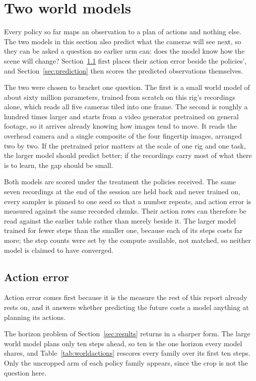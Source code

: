 \section{Two world models}
\label{sec:worldmodels}

Every policy so far maps an observation to a plan of actions and nothing else.
The two models in this section also predict what the cameras will see next, so
they can be asked a question no earlier arm can: does the model know how the
scene will change? Section~\ref{sec:wmactions} first places their action error
beside the policies', and Section~\ref{sec:prediction} then scores the
predicted observations themselves.

The two were chosen to bracket one question. The first is a small world model
of about sixty million parameters, trained from scratch on this rig's
recordings alone, which reads all five cameras tiled into one frame. The second is roughly a hundred times larger and starts from
a video generator pretrained on general footage, so it arrives already knowing
how images tend to move. It reads the overhead camera and a single composite
of the four fingertip images, arranged two by two. If the pretrained prior
matters at the scale of one rig and one task, the larger model should predict
better; if the recordings carry most of what there is to learn, the gap should
be small.

Both models are scored under the treatment the policies received. The same
seven recordings at the end of the session are held back and never trained on,
every sampler is pinned to one seed so that a number repeats, and action error
is measured against the same recorded chunks. Their action rows can therefore
be read against the earlier table rather than merely beside it. The larger
model trained for fewer steps than the smaller one, because each of its steps
costs far more; \unjustified{} the step counts were set by the compute
available, not matched, so neither model is claimed to have converged.

\subsection{Action error}
\label{sec:wmactions}

Action error comes first because it is the measure the rest of this report
already rests on, and it answers whether predicting the future costs a model
anything at planning its actions.

The horizon problem of Section~\ref{sec:results} returns in a sharper form.
The large world model plans only ten steps ahead, so ten is the one horizon
every model shares, and Table~\ref{tab:worldactions} rescores every family
over its first ten steps. Only the uncropped arm of each policy family appears,
since the crop is not the question here.

